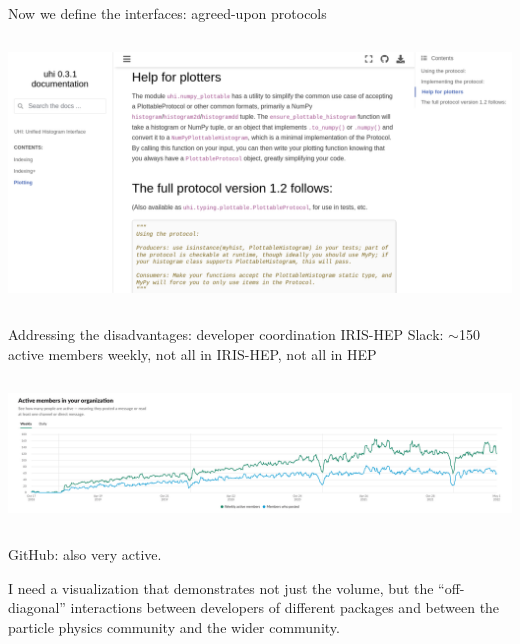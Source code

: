 \documentclass[aspectratio=169]{beamer}
\begin{document}
\begin{frame}{Now we define the interfaces: agreed-upon protocols}
\vspace{0.5 cm}
\begin{columns}
\includegraphics[width=\linewidth]{PLOTS/histogram-protocol-screenshot.png}
\end{columns}
\end{frame}

\begin{frame}{Addressing the disadvantages: developer coordination}
\vspace{0.25 cm}
IRIS-HEP Slack: $\sim$150 active members weekly, not all in IRIS-HEP, not all in HEP

\vspace{0.25 cm}
\begin{columns}
\includegraphics[width=\linewidth]{PLOTS/20220504-iris-hep-slack-analytics-members.png}
\end{columns}

\vspace{0.75 cm}
GitHub: also very active.

\vspace{0.25 cm}
I need a visualization that demonstrates not just the volume, but the ``off-diagonal'' interactions between developers of different packages and between the particle physics community and the wider community.
\end{frame}
\end{document}
